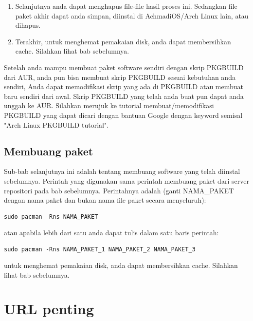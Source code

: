 \documentclass[12pt,]{article}
\begin{document}
\begin{enumerate}
		\item Selanjutnya anda dapat menghapus file-file hasil proses ini.
		Sedangkan file paket akhir dapat anda simpan, diinstal di AchmadiOS/Arch Linux lain, atau dihapus.
		
		\item Terakhir, untuk menghemat pemakaian disk, anda dapat membersihkan cache. Silahkan lihat bab sebelumnya. 
		
	\end{enumerate}

	Setelah anda mampu membuat paket software sendiri dengan skrip PKGBUILD dari AUR,
	anda pun bisa membuat skrip PKGBUILD sesuai kebutuhan anda sendiri,
	Anda dapat memodifikasi skrip yang ada di PKGBUILD atau membuat baru sendiri dari awal.
	Skrip PKGBUILD yang telah anda buat pun dapat anda unggah ke AUR.
	Silahkan merujuk ke tutorial membuat/memodifikasi PKGBUILD yang dapat dicari dengan bantuan Google
	dengan keyword semisal "Arch Linux PKGBUILD tutorial".

	\subsection{Membuang paket}
	
	Sub-bab selanjutnya ini adalah tentang membuang software yang telah diinstal sebelumnya.
	Perintah yang digunakan sama perintah membuang paket dari server repositori pada bab sebelumnya.
	Perintahnya adalah (ganti NAMA\_PAKET dengan nama paket dan bukan nama file paket secara menyeluruh):
	
	\begin{verbatim}
sudo pacman -Rns NAMA_PAKET
	\end{verbatim}
	
	atau apabila lebih dari satu anda dapat tulis dalam satu baris perintah:
	
	\begin{verbatim}
sudo pacman -Rns NAMA_PAKET_1 NAMA_PAKET_2 NAMA_PAKET_3
	\end{verbatim}
	
	untuk menghemat pemakaian disk, anda dapat membersihkan cache. Silahkan lihat bab sebelumnya.
	
	\newpage
	\section{URL penting}
	
\end{document}
